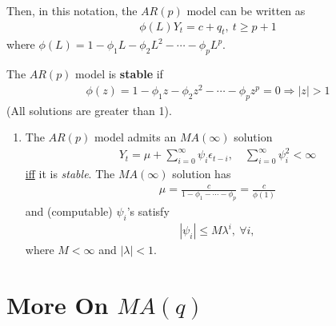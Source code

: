 \documentclass[11pt]{elegantbook}
\begin{document}
Then, in this notation, the $AR(p)$ model can be written as
\begin{equation}
    \begin{aligned}
        \phi(L)Y_t=c+q_t,\ t\geq p+1
    \end{aligned}
    \nonumber
\end{equation}
where $\phi(L)=1-\phi_1 L - \phi_2 L^2 - \cdots - \phi_p L^p$.

\begin{definition}[Stability of $AR(p)$]
    The $AR(p)$ model is \textbf{stable} if \begin{equation}
        \begin{aligned}
            \phi(z)=1-\phi_1 z - \phi_2 z^2 - \cdots - \phi_p z^p=0 \Rightarrow |z|>1
        \end{aligned}
        \nonumber
    \end{equation}
    (All solutions are greater than 1).
\end{definition}

\begin{enumerate}[$\circ$]
    \item The $AR(p)$ model admits an $MA(\infty)$ solution
    \begin{equation}
        \begin{aligned}
            Y_t=\mu+\sum_{i=0}^\infty \psi_i\epsilon_{t-i},\quad \sum_{i=0}^\infty \psi_i^2<\infty
        \end{aligned}
        \nonumber
    \end{equation}
    \underline{iff} it is \textit{stable}.
    The $MA(\infty)$ solution has
    \begin{equation}
        \begin{aligned}
            \mu=\frac{c}{1-\phi_1-\cdots-\phi_p}=\frac{c}{\phi(1)}
        \end{aligned}
        \nonumber
    \end{equation}
    and (computable) $\psi_i$'s satisfy
    \begin{equation}
        \begin{aligned}
            |\psi_i|\leq M \lambda^i,\ \forall i,
        \end{aligned}
        \nonumber
    \end{equation}
    where $M<\infty$ and $|\lambda|<1$.
\end{enumerate}

\section{More On $MA(q)$}
\end{document}
